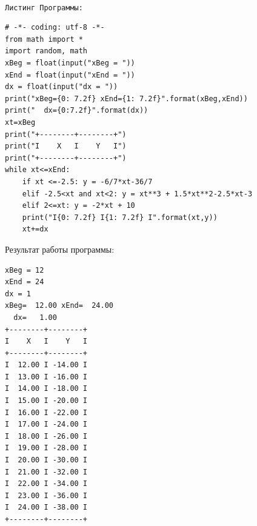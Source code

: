 \documentclass[a4paper]{article}
\begin{document}
\begin{lab3.1}
\begin{algoritm}
\begin{center}
    \end{center}

    \end{algoritm}\\
        \texttt{Листинг Программы:}
        \begin{verbatim}
# -*- coding: utf-8 -*-
from math import *
import random, math
xBeg = float(input("xBeg = "))
xEnd = float(input("xEnd = "))
dx = float(input("dx = "))
print("xBeg={0: 7.2f} xEnd={1: 7.2f}".format(xBeg,xEnd))
print("  dx={0:7.2f}".format(dx))
xt=xBeg
print("+--------+--------+")
print("I    X   I    Y   I")
print("+--------+--------+")
while xt<=xEnd:
    if xt <=-2.5: y = -6/7*xt-36/7
    elif -2.5<xt and xt<2: y = xt**3 + 1.5*xt**2-2.5*xt-3
    elif 2<=xt: y = -2*xt + 10
    print("I{0: 7.2f} I{1: 7.2f} I".format(xt,y))
    xt+=dx
            \end{verbatim}
    \begin{center}Результат работы программы:
        \begin{verbatim}
xBeg = 12
xEnd = 24
dx = 1
xBeg=  12.00 xEnd=  24.00
  dx=   1.00
+--------+--------+
I    X   I    Y   I
+--------+--------+
I  12.00 I -14.00 I
I  13.00 I -16.00 I
I  14.00 I -18.00 I
I  15.00 I -20.00 I
I  16.00 I -22.00 I
I  17.00 I -24.00 I
I  18.00 I -26.00 I
I  19.00 I -28.00 I
I  20.00 I -30.00 I
I  21.00 I -32.00 I
I  22.00 I -34.00 I
I  23.00 I -36.00 I
I  24.00 I -38.00 I
+--------+--------+

        \end{verbatim}
    \end{center}
    \end{lab3.1}
\end{document}

